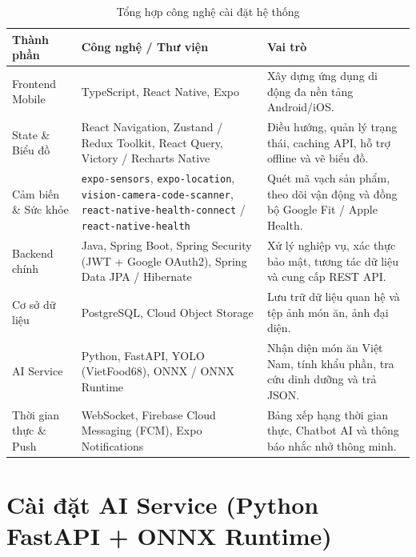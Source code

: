 \documentclass[../main.tex]{subfiles}
\begin{document}
\begin{table}[H]
    \centering
    \caption{Tổng hợp công nghệ cài đặt hệ thống}
    \label{tab:ch4_environment}
    \begin{tabular}{|p{}|p{}|p{}|}
        \hline
        \rowcolor{primary!35}
        \textbf{Thành phần} & \textbf{Công nghệ / Thư viện} & \textbf{Vai trò} \\
        \hline
        Frontend Mobile & TypeScript, React Native, Expo & Xây dựng ứng dụng di động đa nền tảng Android/iOS. \\
        \hline
        State \& Biểu đồ & React Navigation, Zustand / Redux Toolkit, React Query, Victory / Recharts Native & Điều hướng, quản lý trạng thái, caching API, hỗ trợ offline và vẽ biểu đồ. \\
        \hline
        Cảm biến \& Sức khỏe & \texttt{expo-sensors}, \texttt{expo-location}, \texttt{vision-camera-code-scanner}, \texttt{react-native-health-connect} / \texttt{react-native-health} & Quét mã vạch sản phẩm, theo dõi vận động và đồng bộ Google Fit / Apple Health. \\
        \hline
        Backend chính & Java, Spring Boot, Spring Security (JWT + Google OAuth2), Spring Data JPA / Hibernate & Xử lý nghiệp vụ, xác thực bảo mật, tương tác dữ liệu và cung cấp REST API. \\
        \hline
        Cơ sở dữ liệu & PostgreSQL, Cloud Object Storage & Lưu trữ dữ liệu quan hệ và tệp ảnh món ăn, ảnh đại diện. \\
        \hline
        AI Service & Python, FastAPI, YOLO (VietFood68), ONNX / ONNX Runtime & Nhận diện món ăn Việt Nam, tính khẩu phần, tra cứu dinh dưỡng và trả JSON. \\
        \hline
        Thời gian thực \& Push & WebSocket, Firebase Cloud Messaging (FCM), Expo Notifications & Bảng xếp hạng thời gian thực, Chatbot AI và thông báo nhắc nhở thông minh. \\
        \hline
    \end{tabular}
\end{table}

\section{Cài đặt AI Service (Python FastAPI + ONNX Runtime)}
\label{sec:4.2}
\end{document}
